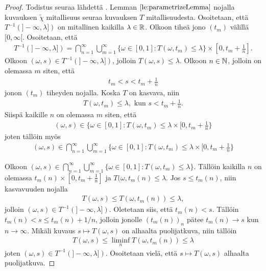 \documentclass[12pt,oneside,a4paper]{amsbook} %
\begin{document}
\begin{proof}
    Todistus seuraa lähdettä \cite[s.40]{optimal}. Lemman $\ref{le:parametrizeLemma}$ nojalla kuvauksen $\tilde \chi$ mitallisuus seuraa kuvauksen $T$ mitallisuudesta. Osoitetaan, että $T^{-1}(]-\infty, \lambda])$ on mitallinen kaikilla $\lambda \in \mathbb{R}$. Olkoon tiheä jono $(t_m)$ välillä $[0, \infty[$. Osoitetaan, että
    \begin{align*}
        T^{-1}(]-\infty, \lambda]) = \bigcap_{n=1}^\infty \bigcup_{m=1}^\infty \{\omega \in [0, 1] : T(\omega, t_m) \le \lambda\} \times [0, t_m + \frac{1}{n}].
    \end{align*}
    Olkoon $(\omega, s) \in T^{-1}(]-\infty, \lambda])$, jolloin $T(\omega, s) \le \lambda$. Olkoon $n \in \mathbb{N}$, jolloin on olemassa $m$ siten, että 
    \begin{align*}
        t_m < s < t_m + \frac{1}{n}
    \end{align*}
    jonon $(t_m)$ tiheyden nojalla. Koska $T$ on kasvava, niin
    \begin{align*}
        T(\omega, t_m) \le \lambda, \text{ kun } s < t_m + \frac{1}{n}.
    \end{align*}
    Siispä kaikille $n$ on olemassa $m$ siten, että
    \begin{align*}
        (\omega, s) \in \{\omega \in [0, 1] : T(\omega, t_m) \le \lambda \times [0, t_m + \frac{1}{n}\}
    \end{align*}
    joten tällöin myös
    \begin{align*}
        (\omega, s) \in \bigcap_{n=1}^\infty \bigcup_{m=1}^\infty\{\omega \in [0, 1] : T(\omega, t_m) \le \lambda \times [0, t_m + \frac{1}{n}\}
    \end{align*}

    Olkoon $(\omega, s) \in \bigcap_{n=1}^\infty \bigcup_{m=1}^\infty \{\omega \in [0, 1] : T(\omega, t_m) \le \lambda\}.$ Tällöin kaikilla $n$ on olemassa $t_m(n) \times [0, t_m + \frac{1}{n}]$ ja $T(\omega, t_m(n) \le \lambda$. Jos $s \le t_m(n)$, niin kasvavuuden nojalla 
    \begin{align*}
        T(\omega, s) \le T(\omega, t_m(n)) \le \lambda,
    \end{align*}
    jolloin $(\omega, s) \in T^{-1}(]-\infty, \lambda])$. Oletetaan siis, että $t_m(n) < s$. Tällöin $t_m(n) < s \le t_m(n) + 1/n$, jolloin jonolle $(t_m(n))_n$ pätee $t_m(n) \to s$ kun $n \to \infty$. Mikäli kuvaus $s \mapsto T(\omega, s)$ on alhaalta puolijatkuva, niin tällöin
    \begin{align*}
        T(\omega, s) \le \liminf_n T(\omega, t_m(n)) \le \lambda
    \end{align*}
    joten $(\omega, s) \in T^{-1}(]-\infty, \lambda])$. Osoitetaan vielä, että $s \mapsto T(\omega, s)$ alhaalta puolijatkuva.
    

\end{proof}
\end{document}
